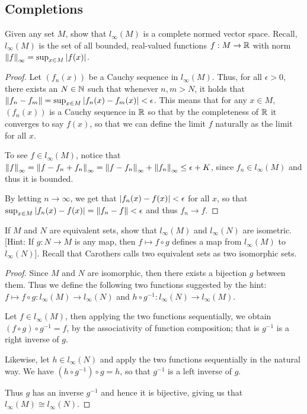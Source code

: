 \subsection{Completions}


\begin{exercise}{44}
Given any set $M$, show that $l_\infty(M)$ is a complete normed vector space.
Recall, $l_\infty(M)$ is the set of all bounded, real-valued functions $f:M\to\mathbb{R}$ with norm $\left\lVert f\right\rVert_\infty=\sup_{x\in M}\left\lvert f(x)\right\rvert$.
\end{exercise}
\begin{proof}
Let $(f_n(x))$ be a Cauchy sequence in $l_\infty(M)$.
Thus, for all $\epsilon>0$, there exists an $N\in\mathbb{N}$ such that whenever $n,m>N$, it holds that $\left\lVert f_n-f_m\right\rVert = \sup_{x\in M}\left\lvert f_n(x)-f_m(x)\right\rvert < \epsilon$.
This means that for any $x\in M$, $(f_n(x))$ is a Cauchy sequence in $\mathbb{R}$ so that by the completeness of $\mathbb{R}$ it converges to say $f(x)$, so that we can define the limit $f$ naturally as the limit for all $x$.

To see $f\in l_\infty(M)$, notice that $\left\lVert f\right\rVert_\infty = \left\lVert f-f_n+f_n\right\rVert_\infty = \left\lVert f-f_n\right\rVert_\infty + \left\lVert f_n\right\rVert_\infty \leq \epsilon + K$, since $f_n\in l_\infty(M)$ and thus it is bounded.

By letting $n\to\infty$, we get that $\left\lvert f_n(x)-f(x)\right\rvert<\epsilon$ for all $x$, so that $\sup_{x\in M}\left\lvert f_n(x)-f(x)\right\rvert = \left\lVert f_n-f\right\rVert < \epsilon$ and thus $f_n\to f$.
\end{proof} 

\begin{exercise}{45}
If $M$ and $N$ are equivalent sets, show that $l_\infty(M)$ and $l_\infty(N)$ are isometric.
[Hint: If $g:N\to M$ is any map, then $f\mapsto f\circ g$ defines a map from $l_\infty(M)$ to $l_\infty(N)$].
Recall that Carothers calls two equivalent sets as two isomorphic sets.
\end{exercise}
\begin{proof}
Since $M$ and $N$ are isomorphic, then there exists a bijection $g$ between them. 
Thus we define the following two functions suggested by the hint: $f\mapsto f\circ g: l_\infty(M) \to l_\infty(N)$ and $h\circ g^{-1}: l_\infty(N) \to l_\infty(M)$.

Let $f\in l_\infty(M)$, then applying the two functions sequentially, we obtain $(f\circ g) \circ g^{-1} = f$, by the associativity of function composition;
that is $g^{-1}$ is a right inverse of $g$.

Likewise, let $h\in l_\infty(N)$ and apply the two functions sequentially in the natural way.
We have $(h\circ g^{-1})\circ g = h$, so that $g^{-1}$ is a left inverse of $g$.

Thus $g$ has an inverse $g^{-1}$ and hence it is bijective, giving us that $l_\infty(M)\cong l_\infty(N)$.
\end{proof} 

